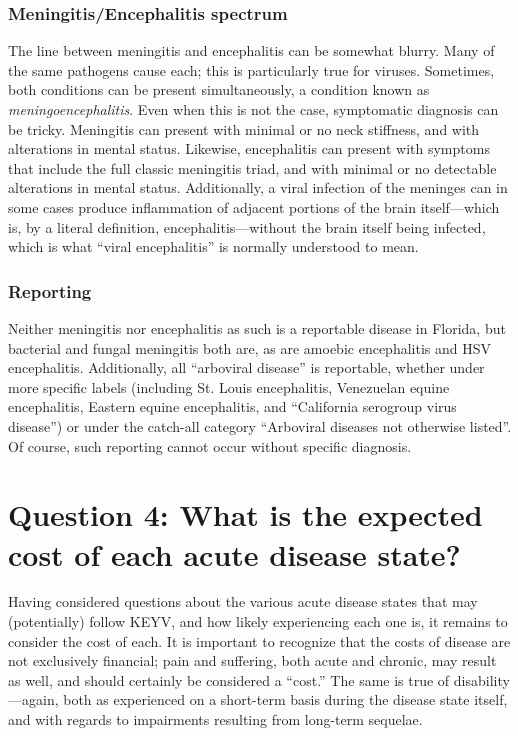 \documentclass[12pt]{article}
\newcommand{\eg}{\textit{e.g.}}
\newcommand{\cjh}{\textcolor{blue}{cjh}}
\newcommand{\tjh}{\textcolor{red}{tjh}}
\newcommand{\msg}[3]{(#1 $\rightarrow$ #2: #3)}
\newcommand{\mct}[1]{\msg\cjh\tjh{#1}}
\begin{document}
        \subsubsection{Meningitis/Encephalitis spectrum}
            \label{spectrum}
            The line between meningitis and encephalitis can be somewhat blurry. Many of the same pathogens cause each; this is particularly true for viruses. Sometimes, both conditions can be present simultaneously, a condition known as \textit{meningoencephalitis}. Even when this is not the case, symptomatic diagnosis can be tricky. Meningitis can present with minimal or no neck stiffness, and with alterations in mental status. Likewise, encephalitis can present with symptoms that include the full classic meningitis triad, and with minimal or no detectable alterations in mental status. Additionally, a viral infection of the meninges can in some cases produce inflammation of adjacent portions of the brain itself---which is, by a literal definition, encephalitis---without the brain itself being infected, which is what ``viral encephalitis'' is normally understood to mean\cite{ropper2014adams}.
        
        \subsubsection{Reporting}
            \label{reporting}
            Neither meningitis nor encephalitis as such is a reportable disease in Florida, but bacterial and fungal meningitis both are, as are amoebic encephalitis and HSV encephalitis. Additionally, all ``arboviral disease'' is reportable, whether under more specific labels (including St. Louis encephalitis, Venezuelan equine encephalitis, Eastern equine encephalitis, and ``California serogroup virus disease'') or under the catch-all category ``Arboviral diseases not otherwise listed''\cite{florida2016reportable}. Of course, such reporting cannot occur without specific diagnosis.


    \section[Expected costs, given diseases]{Question 4: What is the expected cost of each acute disease state?}
        \label{costs}
        Having considered questions about the various acute disease states that may (potentially) follow KEYV, and how likely experiencing each one is, it remains to consider the cost of each. It is important to recognize that the costs of disease are not exclusively financial; pain and suffering, both acute and chronic, may result as well, and should certainly be considered a ``cost.'' The same is true of disability---again, both as experienced on a short-term basis during the disease state itself, and with regards to impairments resulting from long-term sequelae.
\end{document}
